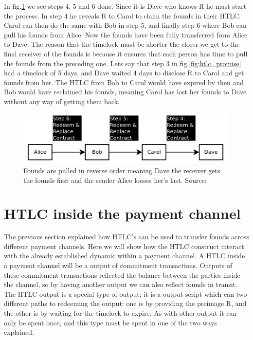 \documentclass[informationsecurity]{gucmasterproject}
\begin{document}
In fig.\ref{fig:htlc_settle} we see steps 4, 5 and 6 done. Since it is Dave who knows R he must start the process. In step 4 he reveals R to Carol to claim the founds in their HTLC. Carol can then do the same with Bob in step 5, and finally step 6 where Bob can pull his founds from Alice.
Now the founds have been fully transferred from Alice to Dave.
The reason that the timelock must be shorter the closer we get to the final receiver of the founds is because it ensures that each person has time to pull the founds from the preceding one. Lets say that step 3 in fig.\ref{fig:htlc_promise} had a timelock of 5 days, and Dave waited 4 days to disclose R to Carol and get founds from her. The HTLC from Bob to Carol would have expired by then and Bob would have reclaimed his founds, meaning Carol has lost her founds to Dave without any way of getting them back.

\begin{figure}[h]
    \centering
    \includegraphics[width=11cm]{htlc_settle.png}
    \caption{ Founds are pulled in reverse order meaning Dave the receiver gets the founds first and the sender Alice looses her's last. Source: \cite{poon2015bitcoin}}
    \label{fig:htlc_settle}
\end{figure}


\section{HTLC inside the payment channel}
The previous section explained how HTLC's can be used to transfer founds across different payment channels.
Here we will show how the HTLC construct interact with the already established dynamic within a payment channel.
A HTLC inside a payment channel will be a output of commitment transactions. Outputs of these commitment transactions reflected the balance between the parties inside the channel, so by having another output we can also reflect founds in transit. The HTLC output is a special type of output; it is a output script which can two different paths to redeeming the output: one is by providing the preimage R, and the other is by waiting for the timelock to expire. As with other output it can only be spent once, and this type must be spent in one of the two ways explained.
\end{document}
